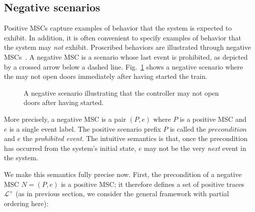 \subsection{Negative scenarios\label{subsection:background-negative-scenarios}}

Positive MSCs capture examples of behavior that the system is expected to exhibit. In addition, it is often convenient to specify examples of behavior that the system may \emph{not} exhibit. Proscribed behaviors are illustrated through negative MSCs~\cite{Uchitel:2004}. A negative MSC is a scenario whose last event is prohibited, as depicted by a crossed arrow below a dashed line. Fig.~\ref{image:train-negative-scenario} shows a negative scenario where the  may not open doors immediately after having started the train.

\begin{figure}\centering
{}
\caption{A negative scenario illustrating that the controller may not open doors after having started.\label{image:train-negative-scenario}}
\end{figure}

More precisely, a negative MSC is a pair $(P,e)$ where $P$ is a positive MSC and $e$ is a single event label. The positive scenario prefix $P$ is called the $precondition$ and $e$ the \emph{prohibited event}. The intuitive semantics is that, once the precondition has occurred from the system's initial state, $e$ may not be the very \emph{next} event in the system. 

We make this semantics fully precise now. First, the precondition of a negative MSC $N = (P,e)$ is a positive MSC; it therefore defines a set of positive traces $\mathcal{L}^{+}$ (as in previous section, we consider the general framework with partial ordering here):

